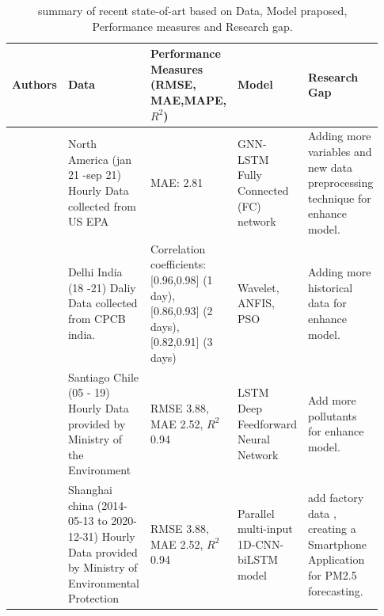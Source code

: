 \documentclass[a4paper,fleqn]{cas-sc}
\begin{document}

  


\begin{landscape}
  \setlength{\tabcolsep}{3pt}
  
  {\renewcommand{\arraystretch}{1}%
  \begin{longtable}[h!]{ p{0.1\linewidth} p{0.2\linewidth} p{0.14\linewidth} p{0.11\linewidth} p{0.38\linewidth} }%
  \caption{summary of recent state-of-art based on Data, Model praposed, Performance measures and Research gap.}
  \label{t_lr}\\
  \hline
  Authors                    & Data                                                                                                     & Performance Measures (RMSE, MAE,MAPE, $R^2$)                                                                    & Model                                                               & Research Gap                                                       \\ \hline
  \endhead
  \hline
  \endfoot
  \endlastfoot
  \cite{li2023nested}                & North America (jan 21 -sep 21)   Hourly Data collected from US EPA                                       & MAE: 2.81                                                                                               & GNN-LSTM Fully Connected (FC) network                              & Adding more variables and new data preprocessing technique for enhance model.                                    \\
  \cite{pruthi2022low}           & Delhi  India (18 -21) Daliy Data collected from   CPCB india.                                            & Correlation coefficients: {[}0.96,0.98{]} (1   day), {[}0.86,0.93{]} (2 days), {[}0.82,0.91{]} (3 days) & Wavelet, ANFIS, PSO                                                 &  Adding more historical data for enhance model.                                                  \\
  \cite{menares2021forecasting}             & Santiago Chile (05 - 19) Hourly   Data provided by Ministry of the Environment                           & RMSE 3.88, MAE 2.52, $R^2$ 0.94                                                                            & LSTM Deep Feedforward Neural Network                               & Add more pollutants for enhance model.               \\
 \cite{zhu2023investigation}            & Shanghai china (2014-05-13 to 2020-12-31)   Hourly Data provided by Ministry of Environmental Protection & RMSE 3.88, MAE 2.52, $R^2$ 0.94                                                                            & Parallel multi-input 1D-CNN-biLSTM   model                          & add  factory data , creating a Smartphone Application for PM2.5 forecasting.                                                         \\



\end{longtable}}
\end{landscape}
\end{document}
